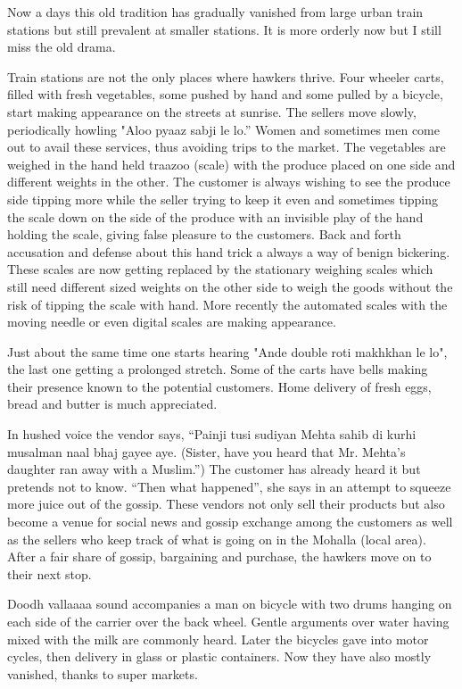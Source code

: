 Now a days this old tradition has gradually vanished from large urban
train stations but still prevalent at smaller stations. It is more orderly
now but I still miss the old drama. 

Train stations are not the only places where hawkers thrive. Four wheeler
carts, filled with fresh vegetables, some pushed by hand and some pulled
by a bicycle, start making appearance on the streets at sunrise. The
sellers move slowly, periodically howling "Aloo pyaaz sabji le lo.” Women
and sometimes men come out to avail these services, thus avoiding trips to
the market. The vegetables are weighed in the hand held traazoo (scale)
with the produce placed on one side and different weights in the other.
The customer is always wishing to see the produce side tipping more while
the seller trying to keep it even and sometimes tipping the scale down on
the side of the produce with an invisible play of the hand holding the
scale, giving false pleasure to the customers. Back and forth accusation
and defense about this hand trick a always a way of benign bickering.
These scales are now getting replaced by the stationary weighing scales
which still need different sized weights on the other side to weigh the
goods without the risk of tipping the scale with hand. More recently the
automated scales with the moving needle or even digital scales are making
appearance. 

Just about the same time one starts hearing "Ande double roti makhkhan le
lo", the last one getting a prolonged stretch. Some of the carts have
bells making their presence known to the potential customers. Home
delivery of fresh eggs, bread and butter is much appreciated. 

In hushed voice the vendor says, “Painji tusi sudiyan Mehta sahib di kurhi
musalman naal bhaj gayee aye. (Sister, have you heard that Mr. Mehta’s
daughter ran away with a Muslim.”) The customer has already heard it but
pretends not to know. “Then what happened”, she says in an attempt to
squeeze more juice out of the gossip. These vendors not only sell their
products but also become a venue for social news and gossip exchange among
the customers as well as the sellers who keep track of what is going on in
the Mohalla  (local area). After a fair share of gossip, bargaining and
purchase, the hawkers move on to their next stop. 

Doodh vallaaaa sound accompanies a man on bicycle with two drums hanging
on each side of the carrier over the back wheel. Gentle arguments over
water having mixed with the milk are commonly heard. Later the bicycles
gave into motor cycles, then delivery in glass or plastic containers. Now
they have also mostly vanished, thanks to super markets. 


